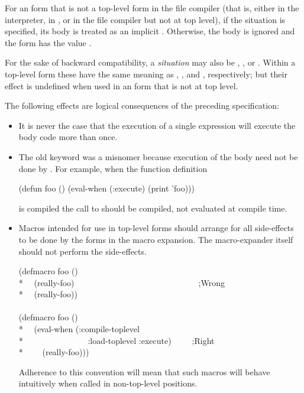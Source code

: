\begin{newer}
\begin{defspec}
  For an  form that is not a top-level form in the file compiler
  (that is, either in the interpreter, in , or in the file
  compiler but not at top level), if the  situation is specified,
  its body is treated as an implicit .  Otherwise, the body
  is ignored and the  form has the value .

  For the sake of backward compatibility,
  a {\it situation} may also be , , or .
  Within a top-level  form
  these have the same meaning as , ,
  and , respectively; but their effect is undefined when used
  in an  form that is not at top level.

  The following effects are logical consequences of the preceding specification:
  \begin{itemize}
   \item It is never the case that the execution of a single 
     expression will execute the body code more than once.

   \item The old keyword  was a misnomer because execution of
     the body need not be done by .  For example, when the
     function definition
     \begin{lisp}
     (defun foo () (eval-when (:execute) (print 'foo)))
     \end{lisp}
     is compiled
     the call to  should be compiled, not evaluated at compile time.

   \item Macros intended for use in top-level forms should arrange for all
     side-effects to be done by the forms in the macro expansion.
     The macro-expander itself should not perform the side-effects.
\begin{lisp}
(defmacro foo () \\*
~~(really-foo)~~~~~~~~~~~~~~~~~~~~~~~~~~~~~~;{\rm Wrong}\\*
~~{\Xbq}(really-foo)) \\
\\
(defmacro foo () \\*
~~{\Xbq}(eval-when (:compile-toplevel \\*
~~~~~~~~~~~~~~~:load-toplevel :execute)~~~~~;{\rm Right} \\*
~~~~(really-foo)))
\end{lisp}
     Adherence to this convention will mean that such macros will behave
     intuitively when called in non-top-level positions.


\end{itemize}
\end{defspec}
\end{newer}
